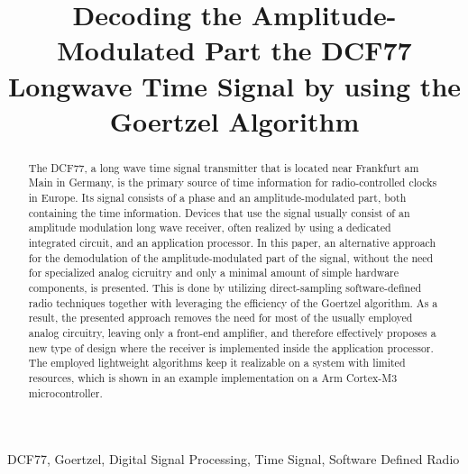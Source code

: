 \documentclass[conference]{IEEEtran}
\begin{document}
\title{Decoding the Amplitude-Modulated Part the DCF77 Longwave Time Signal by using the Goertzel Algorithm}

\author{
}

\maketitle

\begin{abstract}
    The DCF77, a long wave time signal transmitter that is located near Frankfurt am Main in Germany, is the primary source of time information for
    radio-controlled clocks in Europe. Its signal consists of a phase and an amplitude-modulated part, both containing the time information.
    Devices that use the signal usually consist of an amplitude modulation long wave receiver, often realized by using a dedicated integrated circuit, and an
    application processor. In this paper, an alternative approach for the demodulation of the amplitude-modulated part of the signal, without the need for specialized
    analog cicruitry and only a minimal amount of simple hardware components, is presented.
    This is done by utilizing direct-sampling software-defined radio techniques together with leveraging the efficiency of the Goertzel algorithm.
    As a result, the presented approach removes the need for most of the usually employed analog circuitry, leaving only a front-end amplifier, and therefore
    effectively proposes a new type of design where the receiver is implemented inside the application processor.
    The employed lightweight algorithms keep it realizable on a system with limited resources, which is shown in an example implementation on a Arm Cortex-M3 microcontroller. 
\end{abstract}

\begin{IEEEkeywords}
    DCF77, Goertzel, Digital Signal Processing, Time Signal, Software Defined Radio
\end{IEEEkeywords}
\end{document}
